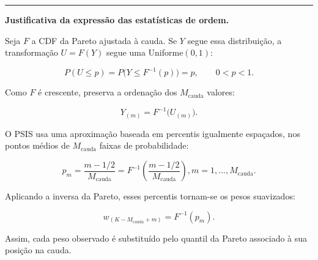 \documentclass[11pt]{article}
\begin{document}
\begin{center}\rule{0.5\linewidth}{0.5pt}\end{center}

\textbf{Justificativa da expressão das estatísticas de ordem.}

Seja \(F\) a CDF da Pareto ajustada à cauda. Se \(Y\) segue essa
distribuição, a transformação \(U=F(Y)\) segue uma Uniforme\((0,1)\):

\[P(U\le p)
=
P\big(Y\le F^{-1}(p)\big)
=
p,
\qquad 0<p<1.\]

Como \(F\) é crescente, preserva a ordenação dos \(M_{\text{cauda}}\)
valores:

\[Y_{(m)}=F^{-1}\big(U_{(m)}\big).\]

O PSIS usa uma aproximação baseada em percentis igualmente espaçados,
nos pontos médios de \(M_{\text{cauda}}\) faixas de probabilidade:

\[p_m=\frac{m-1/2}{M_{\text{cauda}}} = F^{-1}\!\left(\frac{m-1/2}{M_{\text{cauda}}}\right), m=1,\dots,M_{\text{cauda}}.\]

Aplicando a inversa da Pareto, esses percentis tornam-se os pesos
suavizados:

\[w_{(K-M_{\text{cauda}}+m)}
=
F^{-1}(p_m).\]

Assim, cada peso observado é substituído pelo quantil da Pareto
associado à sua posição na cauda.
\end{document}
